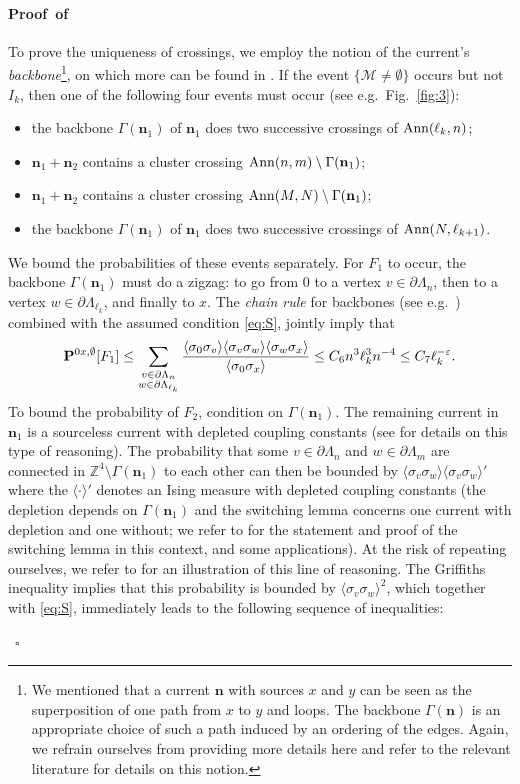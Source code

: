\documentclass[a4paper,oneside,11pt]{article}
\def\Z{\mathbb{Z}}                          %
\numberwithin{equation}{section}
\numberwithin{equation}{section}
\numberwithin{equation}{section}
\newenvironment{proof}[1][\relax]%
  {\paragraph{Proof\ifx#1\relax\else~of #1\fi}}%
  {~\hfill$\square$\par\bigskip}
\newcommand{\calM}{\mathcal{M}}
\def\Z{\mathbb{Z}}                          %
\newcommand{\ep}{\varepsilon}
\newcommand{\n}{\mathbf{n}}
\begin{document}
\begin{proof}
To prove the uniqueness of crossings, we employ the notion of the current's {\em backbone}\footnote{We mentioned that a current $\n$ with sources $x$ and $y$ can be seen as the superposition of one path from $x$ to $y$ and loops. The backbone
$\Gamma(\n)$ is an appropriate choice of such a path induced by an ordering of the edges. Again, we refrain ourselves from providing more details here and refer to the relevant literature for details on this notion.}, on which more can be found in  \cite{Aiz82,AizBarFer87,Dum16,Dum17,DumTas15}. If the event $\{\calM\ne \emptyset\}$ occurs but not $I_k$, then one of the following four events must occur (see e.g.~Fig.~\ref{fig:3}): \begin{itemize}[noitemsep]
\item[$F_1:=$] the backbone $\Gamma(\n_1)$ of $\n_1$ does two successive crossings of ${\rm Ann}(\ell_{k},n)$;
\item[$F_2:=$] $\n_1+\n_2$ contains a cluster crossing ${\rm Ann}(n,m)\setminus\Gamma(\n_1)$;
\item[$F_3:=$] $\n_1+\n_2$ contains a cluster crossing ${\rm Ann}(M,N)\setminus \Gamma(\n_1)$;
\item[$F_4:=$] the backbone $\Gamma(\n_1)$ of $\n_1$  does two successive crossings of ${\rm Ann}(N,\ell_{k+1})$.  
\end{itemize}
We bound the probabilities of these events separately.  
For $F_1$ to occur, the backbone $\Gamma(\n_1)$ must do a zigzag: to go from 0 to a vertex $v\in\partial\Lambda_n$, then to a vertex $w\in\partial\Lambda_{\ell_k}$, and finally to $x$. 
The {\em chain rule} for backbones (see e.g.~\cite{AizBarFer87}) combined with 
the assumed condition \eqref{eq:S}, jointly imply that 
\begin{equation}\label{eq:bound}{\bf P}^{0x,\emptyset}[F_1]\le \sum_{\substack{v\in \partial\Lambda_{n}\\w\in \partial\Lambda_{\ell_{k}}}}\frac{\langle\sigma_0\sigma_v\rangle\langle\sigma_v\sigma_w\rangle\langle\sigma_w\sigma_x\rangle}{\langle\sigma_0\sigma_x\rangle}\le C_6 n^3\ell_{k}^3 n^{-4}\le C_7\ell_{k}^{-\ep}.\end{equation}
To bound the probability of $F_2$, condition on $\Gamma(\n_1)$. The remaining current in $\n_1$ is a sourceless current with depleted coupling constants (see \cite{AizBarFer87,Dum16,Dum17} for details on this type of reasoning). The probability that some $v\in\partial\Lambda_n$ and $w\in \partial\Lambda_m$ are connected in $\Z^4\setminus \Gamma(\n_1)$ to each other can then be bounded by $\langle\sigma_v\sigma_w\rangle\langle\sigma_v\sigma_w\rangle'$ where the $\langle\cdot\rangle'$ denotes an Ising measure with depleted coupling constants (the depletion depends on $\Gamma(\n_1)$ and the switching lemma concerns one current with depletion and one without; we refer to \cite{AizDumSid15} for the statement and proof of the switching lemma in this context, and some applications). At the risk of repeating ourselves, we refer to \cite{AizBarFer87} for an illustration of this line of reasoning. The Griffiths inequality \cite{Gri67} implies that this probability is bounded by $\langle\sigma_v\sigma_w\rangle^2$, which together with \eqref{eq:S}, immediately leads to the following sequence of inequalities: 

\end{proof}
\end{document}
